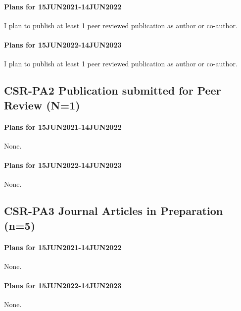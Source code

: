 		\paragraph{Plans for 15JUN2021-14JUN2022}
I plan to publish at least 1 peer reviewed publication as author or co-author.
\paragraph{Plans for 15JUN2022-14JUN2023}
I plan to publish at least 1 peer reviewed publication as author or co-author.			

\subsection{CSR-PA2 Publication submitted for Peer Review (N=1)}
\begin{refsection}
	\nocite{moore_detecting_2022}
	\printbibliography[heading=none]	
\end{refsection}
\paragraph{Plans for 15JUN2021-14JUN2022} None.	
\paragraph{Plans for 15JUN2022-14JUN2023} None.

\subsection{CSR-PA3 Journal Articles in Preparation (n=5)}
\begin{refsection}
	\nocite{moore_first_nodate-1,moore_mariana_2013,moore_three_nodate-1,moore_change_nodate,moore_coconut_nodate-1}	
	\printbibliography[heading=none]		
\end{refsection}
\paragraph{Plans for 15JUN2021-14JUN2022} None.
\paragraph{Plans for 15JUN2022-14JUN2023} None.

